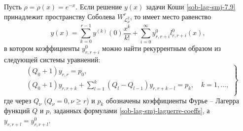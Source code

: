 \begin{theorem}\label{cauchy-lag-const}
Пусть $\rho=\rho(x)=e^{-x}$. Если решение $y(x)$ задачи Коши \eqref{sob-lag-smj-7.9} принадлежит пространству Соболева $W^{r}_{\mathcal{L}_{\rho}^2}$, то имеет место равенство
\begin{equation*}
y(x)= \sum_{k=0}^{r-1} y^{(k)}(0)\frac{x^k}{k!}+ \sum_{i=0}^\infty y_{r,r+i}^0 l_{r,r+i}^0(x),
\end{equation*}
в котором коэффициенты $y^0_{r,r+i}$ можно найти рекуррентным образом из следующей системы уравнений:
\begin{equation}\label{sob-lag-smj-7.8}
\left.
\begin{aligned}
&(Q_0+1)y_{r,r}=p_0,\\
&(Q_0+1)y_{r,r+k}+\sum\limits_{l=1}^{k}(Q_{l}-Q_{l-1})y_{r,r+k-l}=p_k, \quad k=1,\ldots,\\
\end{aligned}
\right\}
\end{equation}
где через $Q_\nu$ ($Q_\nu=0, \nu \ge r$) и $p_k$ обозначены коэффициенты Фурье -- Лагерра функций $Q$ и $p$, заданных формулами \eqref{sob-lag-smj-laguerre-coeffs}, а $y_{r,r+l}=y^0_{r,r+l}$.
\end{theorem} 